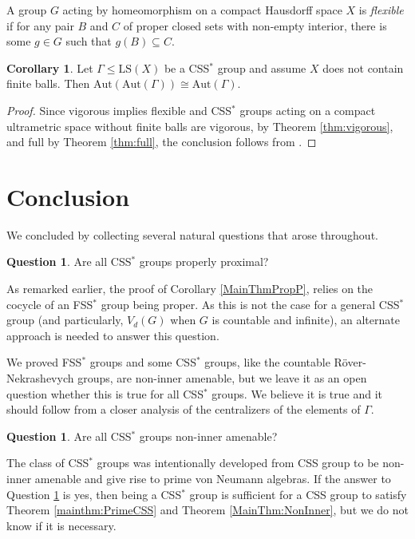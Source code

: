 \documentclass[12pt]{amsart}
\numberwithin{equation}{subsection}
\theoremstyle{definition}
\newtheorem{corollary}[theorem]{Corollary}
\theoremstyle{definition}
\newtheorem{question}[theorem]{Question}
\theoremstyle{remark}
\begin{document}
A group $G$ acting by homeomorphism on a compact Hausdorff space $X$ is \emph{flexible} if for any pair $B$ and $C$ of proper closed sets with non-empty interior, there is some $g \in G$ such that $g(B) \subseteq C$. 

\begin{corollary}
Let $\Gamma \leq \text{LS}(X)$ be a CSS$^*$ group and assume $X$ does not contain finite balls. Then $\text{Aut}(\text{Aut}(\Gamma)) \cong \text{Aut}(\Gamma)$.
\end{corollary}
\begin{proof}
Since vigorous implies flexible and CSS$^*$ groups acting on a compact ultrametric space without finite balls are vigorous, by Theorem \ref{thm:vigorous}, and full by Theorem \ref{thm:full}, the conclusion follows from \cite[Theorem 1.1]{Olukoya2021}.

\end{proof}


\section{Conclusion}
We concluded by collecting several natural questions that arose throughout.

\begin{question}
    Are all CSS$^*$ groups properly proximal?
\end{question}

As remarked earlier, the proof of Corollary \ref{MainThmPropP}, relies on the cocycle of an FSS$^*$ group being proper. As this is not the case for a general CSS$^*$ group (and particularly, $V_d(G)$ when $G$ is countable and infinite), an alternate approach is needed to answer this question.


We proved FSS$^*$ groups and some CSS$^*$ groups, like the countable R\"over-Nekrashevych groups, are non-inner amenable, but we leave it as an open question whether this is true for all CSS$^*$ groups. We believe it is true and it should follow from a closer analysis of the centralizers of the elements of $\Gamma$. 

\begin{question}\label{q:noninner}
    Are all CSS$^*$ groups non-inner amenable? 
\end{question}

The class of CSS$^*$ groups was intentionally developed from CSS group to be non-inner amenable and give rise to prime von Neumann algebras. If the answer to Question \ref{q:noninner} is yes, then being a CSS$^*$ group is sufficient for a CSS group to satisfy Theorem \ref{mainthm:PrimeCSS} and Theorem \ref{MainThm:NonInner}, but we do not know if it is necessary.
\end{document}
